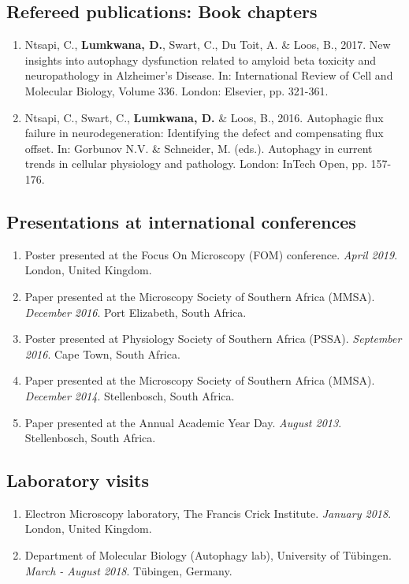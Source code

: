 \subsection*{Refereed publications: Book chapters}
\begin{enumerate}
\item Ntsapi, C., \textbf{Lumkwana, D.}, Swart, C., Du Toit, A. \& Loos, B., 2017. New insights into autophagy dysfunction related to amyloid beta toxicity and neuropathology in Alzheimer’s Disease. In: International Review of Cell and Molecular Biology, Volume 336. London: Elsevier, pp. 321-361.
\item Ntsapi, C., Swart, C., \textbf{Lumkwana, D.} \& Loos, B., 2016. Autophagic flux failure in neurodegeneration: Identifying the defect and compensating flux offset. In: Gorbunov N.V. \& Schneider, M. (eds.). Autophagy in current trends in cellular physiology and pathology. London: InTech Open, pp. 157-176.
\end{enumerate}

\subsection*{Presentations at international conferences}
\begin{enumerate}
\item Poster presented at the Focus On Microscopy (FOM) conference. \textit{April 2019}. London, United Kingdom.
\item Paper presented at the Microscopy Society of Southern Africa (MMSA). \textit{December 2016}. Port Elizabeth, South Africa.
\item Poster presented at Physiology Society of Southern Africa (PSSA). \textit{September 2016}. Cape Town, South Africa.
\item Paper presented at the Microscopy Society of Southern Africa (MMSA). \textit{December 2014}. Stellenbosch, South Africa.
\item Paper presented at the Annual Academic Year Day. \textit{August 2013}. Stellenbosch, South Africa.
\end{enumerate}

\subsection*{Laboratory visits}
\begin{enumerate}
\item Electron Microscopy laboratory, The Francis Crick Institute. \textit{January 2018}. London, United Kingdom.
\item Department of Molecular Biology (Autophagy lab), University of T{\"u}bingen. \textit{March - August 2018}. T{\"u}bingen, Germany.
\end{enumerate}
\newpage

